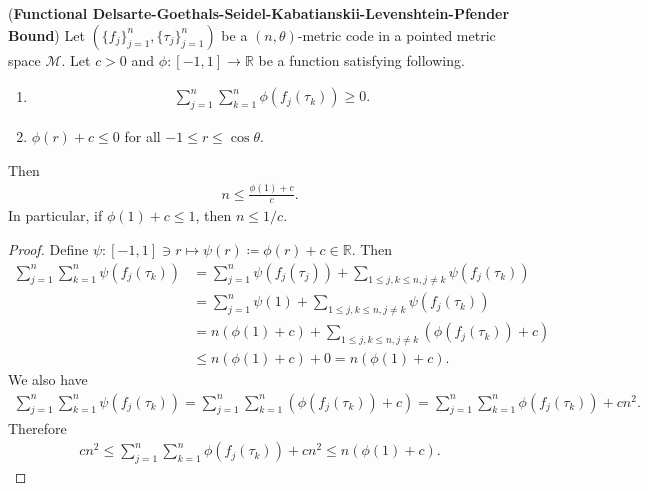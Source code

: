 \documentclass[10pt,a4paper]{amsart}
\begin{document}
\begin{theorem} (\textbf{Functional Delsarte-Goethals-Seidel-Kabatianskii-Levenshtein-Pfender Bound}) \label{FDGSP}
	Let $ (\{f_j \}_{j=1}^n, \{\tau_j \}_{j=1}^n) $  be a  $(n,\theta )$-metric  code in a  pointed metric space $\mathcal{M}$. Let $c>0$ and $\phi:[-1,1]\to \mathbb{R}$ be a function satisfying following.
\begin{enumerate}[\upshape(i)]
	\item 
	\begin{align*}
		\sum_{j=1}^n\sum_{k =1}^n\phi(f_j(\tau_k))\geq 0.	
	\end{align*}
	\item $\phi(r)+c\leq 0$ for all $-1\leq r \leq \cos \theta$.
\end{enumerate}
Then 
\begin{align*}
	n\leq \frac{\phi(1)+c}{c}.
\end{align*}
In particular, if $\phi(1)+c\leq 1$, then $n\leq 1/c$.	
\end{theorem}

\begin{proof}
	Define $\psi:[-1,1]\ni r \mapsto \psi(r)\coloneqq \phi(r)+c\in \mathbb{R}$. Then 
	\begin{align*}
	\sum_{j=1}^n\sum_{k =1}^n\psi(f_j(\tau_k))&=\sum_{j=1}^{n}\psi(f_j(\tau_j))+\sum_{1\leq j,k \leq n, j \neq k}\psi(f_j(\tau_k))\\
	&=\sum_{j=1}^{n}\psi(1)+\sum_{1\leq j,k \leq n, j \neq k}\psi(f_j(\tau_k))\\
	&=n(\phi(1)+c)+\sum_{1\leq j,k \leq n, j \neq k}(\phi(f_j(\tau_k))+c)\\
	&\leq n(\phi(1)+c)+0=n(\phi(1)+c).
	\end{align*}
We also have 
\begin{align*}
	\sum_{j=1}^n\sum_{k =1}^n\psi(f_j(\tau_k))=	\sum_{j=1}^n\sum_{k =1}^n(\phi(f_j(\tau_k))+c)=	\sum_{j=1}^n\sum_{k =1}^n\phi(f_j(\tau_k))+cn^2.
\end{align*}
Therefore 
\begin{align*}
	cn^2\leq 	\sum_{j=1}^n\sum_{k =1}^n\phi(f_j(\tau_k))+cn^2\leq n(\phi(1)+c).
\end{align*}
\end{proof}
\end{document}
